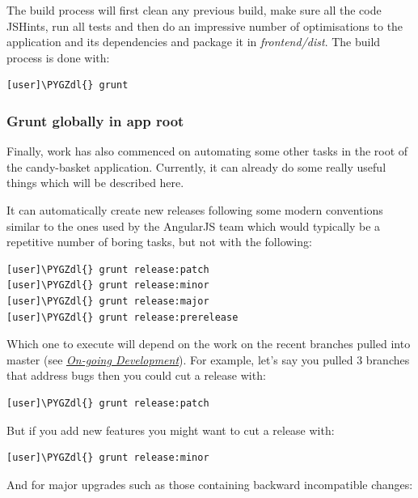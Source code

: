\documentclass[letterpaper,10pt,english]{sphinxmanual}
\def\PYGZdl{\char`\$}
\begin{document}
The build process will first clean any previous build, make sure all
the code JSHints, run all tests and then do an impressive number of
optimisations to the application and its dependencies and package it
in \emph{frontend/dist}. The build process is done with:

\begin{Verbatim}[commandchars=\\\{\}]
[user]\PYGZdl{} grunt
\end{Verbatim}


\subsubsection{Grunt globally in app root}
\label{developer-guide:grunt-globally-in-app-root}
Finally, work has also commenced on automating some other tasks in the
root of the candy-basket application. Currently, it can already do
some really useful things which will be described here.

It can automatically create new releases following some modern
conventions similar to the ones used by the AngularJS team which would
typically be a repetitive number of boring tasks, but not with the
following:

\begin{Verbatim}[commandchars=\\\{\}]
[user]\PYGZdl{} grunt release:patch
[user]\PYGZdl{} grunt release:minor
[user]\PYGZdl{} grunt release:major
[user]\PYGZdl{} grunt release:prerelease
\end{Verbatim}

Which one to execute will depend on the work on the recent branches
pulled into master (see {\hyperref[developer-guide:ongoingdev]{\emph{On-going Development}}}). For example, let's
say you pulled 3 branches that address bugs then you could cut a
release with:

\begin{Verbatim}[commandchars=\\\{\}]
[user]\PYGZdl{} grunt release:patch
\end{Verbatim}

But if you add new features you might want to cut a release with:

\begin{Verbatim}[commandchars=\\\{\}]
[user]\PYGZdl{} grunt release:minor
\end{Verbatim}

And for major upgrades such as those containing backward incompatible
changes:
\end{document}
